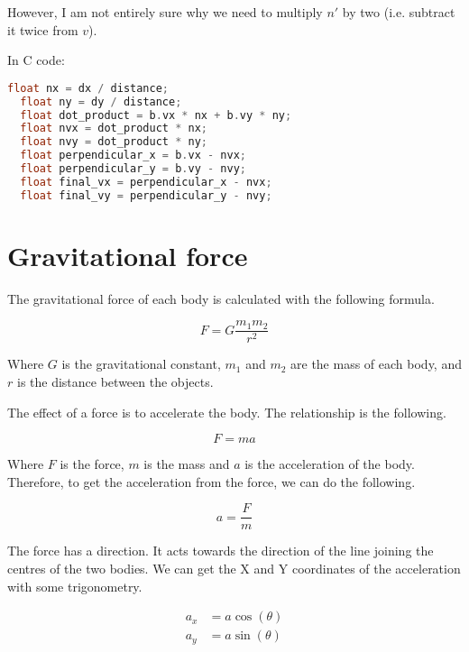 \documentclass{amsart}
\begin{document}
However, I am not entirely sure why we need to multiply $n'$ by two
(i.e. subtract it twice from $v$).

\bigskip

In C code:

\begin{lstlisting}[language=C]
  float nx = dx / distance;
  float ny = dy / distance;
  float dot_product = b.vx * nx + b.vy * ny;
  float nvx = dot_product * nx;
  float nvy = dot_product * ny;
  float perpendicular_x = b.vx - nvx;
  float perpendicular_y = b.vy - nvy;
  float final_vx = perpendicular_x - nvx;
  float final_vy = perpendicular_y - nvy;
\end{lstlisting}

\section{Gravitational force}

The gravitational force of each body is calculated with the following formula.

\begin{displaymath}
  F = G \frac{m_1m_2}{r^2}
\end{displaymath}

Where $G$ is the gravitational constant, $m_1$ and $m_2$ are the mass of each
body, and $r$ is the distance between the objects.

The effect of a force is to accelerate the body. The relationship is the
following.

\begin{displaymath}
  F = m a
\end{displaymath}

Where $F$ is the force, $m$ is the mass and $a$ is the acceleration of the
body. Therefore, to get the acceleration from the force, we can do the
following.

\begin{displaymath}
  a = \frac{F}{m}
\end{displaymath}

The force has a direction. It acts towards the direction of the line joining
the centres of the two bodies. We can get the X and Y coordinates of the
acceleration with some trigonometry.

\begin{align*}
  a_x &= a \cos(\theta) \\
  a_y &= a \sin(\theta) \\
\end{align*}
\end{document}
